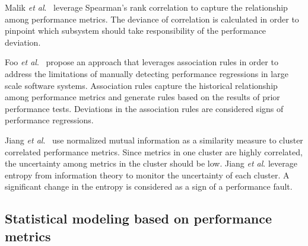 Malik \emph{et al$.$}~\cite{5635038} leverage Spearman's rank correlation to capture the relationship among performance metrics. The deviance of correlation is calculated in order to pinpoint which subsystem should take responsibility of the performance deviation.

Foo\emph{ et al$.$}~\cite{foo2010mining} propose an approach that leverages association rules in order to address the limitations of manually detecting performance regressions in large scale software systems. Association rules capture the historical relationship among performance metrics and generate rules based on the results of prior performance tests. Deviations in the association rules are considered signs of performance regressions.

Jiang \emph{et al$.$}~\cite{5270324} use normalized mutual information as a similarity measure to cluster correlated performance metrics. Since metrics in one cluster are highly correlated, the uncertainty among metrics in the cluster should be low. Jiang \emph{et al$.$} leverage entropy from information theory to monitor the uncertainty of each cluster. A significant change in the entropy is considered as a sign of a performance fault. %



\subsection{Statistical modeling based on performance metrics}
\label{sec:relatedmodel}

